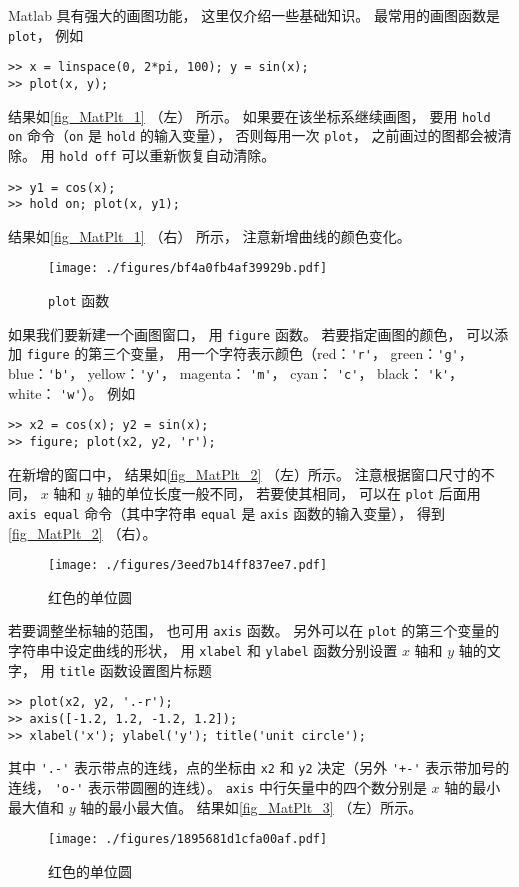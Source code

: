 

Matlab 具有强大的画图功能， 这里仅介绍一些基础知识。 最常用的画图函数是 \verb`plot`， 例如
\begin{lstlisting}[language=matlabC]
>> x = linspace(0, 2*pi, 100); y = sin(x);
>> plot(x, y);
\end{lstlisting}
结果如\autoref{fig_MatPlt_1} （左） 所示。 如果要在该坐标系继续画图， 要用 \verb`hold on` 命令（\verb`on` 是 \verb`hold` 的输入变量）， 否则每用一次 \verb`plot`， 之前画过的图都会被清除。 用 \verb`hold off` 可以重新恢复自动清除。
\begin{lstlisting}[language=matlabC]
>> y1 = cos(x);
>> hold on; plot(x, y1);
\end{lstlisting}
结果如\autoref{fig_MatPlt_1} （右） 所示， 注意新增曲线的颜色变化。
\begin{figure}[ht]
\centering
\texttt{[image: ./figures/bf4a0fb4af39929b.pdf]}
\caption{\lstinline|plot| 函数} \label{fig_MatPlt_1}
\end{figure}

如果我们要新建一个画图窗口， 用 \verb`figure` 函数。 若要指定画图的颜色， 可以添加 \verb`figure` 的第三个变量， 用一个字符表示颜色（red：\verb`'r'`， green：\verb`'g'`， blue：\verb`'b'`， yellow：\verb`'y'`， magenta： \verb`'m'`， cyan： \verb`'c'`， black： \verb`'k'`， white： \verb`'w'`）。 例如
\begin{lstlisting}[language=matlabC]
>> x2 = cos(x); y2 = sin(x);
>> figure; plot(x2, y2, 'r');
\end{lstlisting}
在新增的窗口中， 结果如\autoref{fig_MatPlt_2} （左）所示。 注意根据窗口尺寸的不同， $x$ 轴和 $y$ 轴的单位长度一般不同， 若要使其相同， 可以在 \verb`plot` 后面用 \verb`axis equal` 命令（其中字符串 \verb`equal` 是 \verb`axis` 函数的输入变量）， 得到\autoref{fig_MatPlt_2} （右）。
\begin{figure}[ht]
\centering
\texttt{[image: ./figures/3eed7b14ff837ee7.pdf]}
\caption{红色的单位圆} \label{fig_MatPlt_2}
\end{figure}
若要调整坐标轴的范围， 也可用 \verb`axis` 函数。 另外可以在 \verb`plot` 的第三个变量的字符串中设定曲线的形状， 用 \verb`xlabel` 和 \verb`ylabel` 函数分别设置 $x$ 轴和 $y$ 轴的文字， 用 \verb`title` 函数设置图片标题
\begin{lstlisting}[language=matlabC]
>> plot(x2, y2, '.-r');
>> axis([-1.2, 1.2, -1.2, 1.2]);
>> xlabel('x'); ylabel('y'); title('unit circle');
\end{lstlisting}
其中 \verb`'.-'` 表示带点的连线，点的坐标由 \verb`x2` 和 \verb`y2` 决定（另外 \verb`'+-'` 表示带加号的连线， \verb`'o-'` 表示带圆圈的连线）。 \verb`axis` 中行矢量中的四个数分别是 $x$ 轴的最小最大值和 $y$ 轴的最小最大值。 结果如\autoref{fig_MatPlt_3} （左）所示。
\begin{figure}[ht]
\centering
\texttt{[image: ./figures/1895681d1cfa00af.pdf]}
\caption{红色的单位圆} \label{fig_MatPlt_3}
\end{figure}

